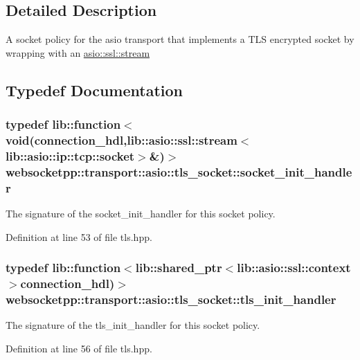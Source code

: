 \subsection{Detailed Description}
A socket policy for the asio transport that implements a T\+L\+S encrypted socket by wrapping with an \hyperlink{classasio_1_1ssl_1_1stream}{asio\+::ssl\+::stream} 

\subsection{Typedef Documentation}
\hypertarget{namespacewebsocketpp_1_1transport_1_1asio_1_1tls__socket_a0ec24de8bf054a4bc6f6c018e743efea}{}
\subsubsection[{socket\+\_\+init\+\_\+handler}]{\setlength{\rightskip}{0pt plus 5cm}typedef lib\+::function$<$void({\bf connection\+\_\+hdl},lib\+::asio\+::ssl\+::stream$<$ lib\+::asio\+::ip\+::tcp\+::socket$>$\&)$>$ {\bf websocketpp\+::transport\+::asio\+::tls\+\_\+socket\+::socket\+\_\+init\+\_\+handler}}\label{namespacewebsocketpp_1_1transport_1_1asio_1_1tls__socket_a0ec24de8bf054a4bc6f6c018e743efea}


The signature of the socket\+\_\+init\+\_\+handler for this socket policy. 



Definition at line 53 of file tls.\+hpp.

\hypertarget{namespacewebsocketpp_1_1transport_1_1asio_1_1tls__socket_a6fe279813cc19b05a3897d20f10f16d2}{}
\subsubsection[{tls\+\_\+init\+\_\+handler}]{\setlength{\rightskip}{0pt plus 5cm}typedef lib\+::function$<$lib\+::shared\+\_\+ptr$<$lib\+::asio\+::ssl\+::context$>${\bf connection\+\_\+hdl})$>$ {\bf websocketpp\+::transport\+::asio\+::tls\+\_\+socket\+::tls\+\_\+init\+\_\+handler}}\label{namespacewebsocketpp_1_1transport_1_1asio_1_1tls__socket_a6fe279813cc19b05a3897d20f10f16d2}


The signature of the tls\+\_\+init\+\_\+handler for this socket policy. 



Definition at line 56 of file tls.\+hpp.

